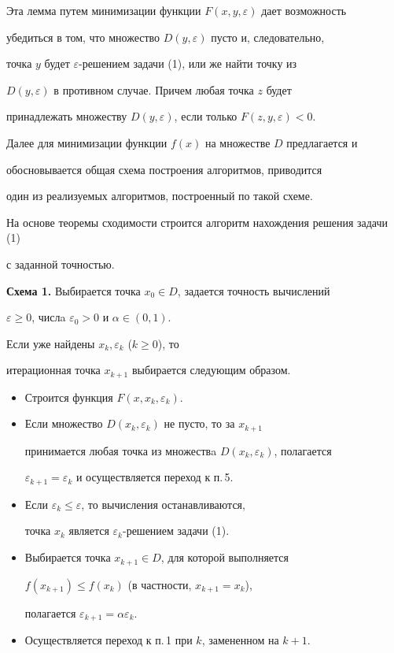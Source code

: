 Эта лемма путем минимизации функции $F(x,y,\varepsilon)$ дает возможность


убедиться в том, что множество $D(y,\varepsilon)$ пусто и, следовательно,


точка $y$ будет $\varepsilon$-решением задачи (1), или же найти точку из


$D(y,\varepsilon)$ в противном случае. Причем любая точка $z$ будет


принадлежать множеству $D(y,\varepsilon)$, если только $F(z,y,\varepsilon)<0$.





Далее для минимизации функции $f(x)$ на множестве $D$ предлагается и


обосновывается общая схема построения алгоритмов, приводится


один из реализуемых алгоритмов, построенный по такой схеме. 


На основе теоремы сходимости строится алгоритм нахождения решения задачи (1)


с заданной точностью.


\medskip





{\bf Схема 1.} Выбирается точка $x_0\in D$, задается точность вычислений


$\varepsilon\ge0$, числa $\varepsilon_0>0$ и $\alpha\in (0,1)$.





Если уже найдены $x_k,\varepsilon_k$ ($k\geq0$), то


итерационная точка $x_{k+1}$ выбирается следующим образом.


\begin{itemize}


\item[1.] Строится функция $F(x,x_k,\varepsilon_k)$.


\item[2.] Если множество $D(x_k,\varepsilon_k)$ не пусто, то за $x_{k+1}$


принимается любая точка из множествa $D(x_k,\varepsilon_k)$, полагается


$\varepsilon_{k+1}=\varepsilon_k$ и осуществляется переход к п.\,5.


\item[3.] Если $\varepsilon_k\le \varepsilon$, то вычисления останавливаются,


точка $x_k$ является $\varepsilon_k$-решением задачи (1).


\item[4.] Выбирается точка $x_{k+1}\in D$, для которой выполняется


$f(x_{k+1})\le f(x_k)$ (в частности, $x_{k+1}=x_k$),


полагается $\varepsilon_{k+1}=\alpha\varepsilon_k$. 


\item[5.] Осуществляется переход к п.\,1 при $k$, замененном на $k+1$.


\end{itemize}





